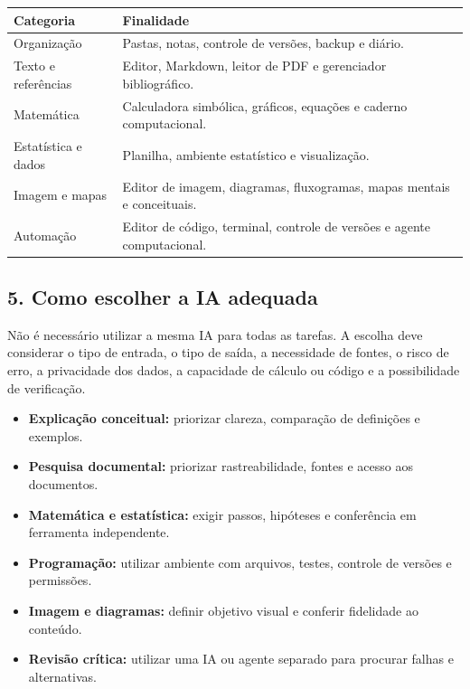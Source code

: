 \documentclass[11pt,a4paper]{article}
\begin{document}
{\small
\begin{tabular}{|p{}|p{}|}
\hline
\textbf{Categoria} & \textbf{Finalidade} \\
\hline
Organização & Pastas, notas, controle de versões, backup e diário. \\
\hline
Texto e referências & Editor, Markdown, leitor de PDF e gerenciador bibliográfico. \\
\hline
Matemática & Calculadora simbólica, gráficos, equações e caderno computacional. \\
\hline
Estatística e dados & Planilha, ambiente estatístico e visualização. \\
\hline
Imagem e mapas & Editor de imagem, diagramas, fluxogramas, mapas mentais e conceituais. \\
\hline
Automação & Editor de código, terminal, controle de versões e agente computacional. \\
\hline
\end{tabular}
}

\subsection*{5. Como escolher a IA adequada}

Não é necessário utilizar a mesma IA para todas as tarefas. A escolha deve considerar o
tipo de entrada, o tipo de saída, a necessidade de fontes, o risco de erro, a privacidade
dos dados, a capacidade de cálculo ou código e a possibilidade de verificação.

\begin{itemize}
\item \textbf{Explicação conceitual:} priorizar clareza, comparação de definições e exemplos.
\item \textbf{Pesquisa documental:} priorizar rastreabilidade, fontes e acesso aos documentos.
\item \textbf{Matemática e estatística:} exigir passos, hipóteses e conferência em ferramenta independente.
\item \textbf{Programação:} utilizar ambiente com arquivos, testes, controle de versões e permissões.
\item \textbf{Imagem e diagramas:} definir objetivo visual e conferir fidelidade ao conteúdo.
\item \textbf{Revisão crítica:} utilizar uma IA ou agente separado para procurar falhas e alternativas.
\end{itemize}
\end{document}
